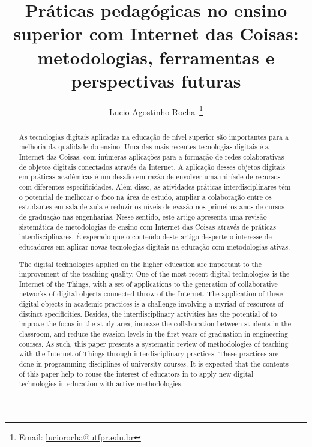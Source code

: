 \documentclass[portuguese]{textolivre}
\title{Práticas pedagógicas no ensino superior com Internet das Coisas: metodologias, ferramentas e perspectivas futuras}
\author[1]{Lucio Agostinho Rocha~\orcid{0000-0001-8804-8698}\thanks{Email: \href{mailto:luciorocha@utfpr.edu.br}{luciorocha@utfpr.edu.br}}}
\affil[1]{Universidade Tecnológica Federal do Paraná – campus Apucarana, Engenharia de Computação, Apucarana, PR, Brasil.}
\begin{document}
\maketitle

\begin{polyabstract}
\begin{abstract}
As tecnologias digitais aplicadas na educação de nível superior são importantes para a melhoria da qualidade do ensino. Uma das mais recentes tecnologias digitais é a Internet das Coisas, com inúmeras aplicações para a formação de redes colaborativas de objetos digitais conectados através da Internet. A aplicação desses objetos digitais em práticas acadêmicas é um desafio em razão de envolver uma miríade de recursos com diferentes especificidades. Além disso, as atividades práticas interdisciplinares têm o potencial de melhorar o foco na área de estudo, ampliar a colaboração entre os estudantes em sala de aula e reduzir os níveis de evasão nos primeiros anos de cursos de graduação nas engenharias. Nesse sentido, este artigo apresenta uma revisão sistemática de metodologias de ensino com Internet das Coisas através de práticas interdisciplinares. É esperado que o conteúdo deste artigo desperte o interesse de educadores em aplicar novas tecnologias digitais na educação com metodologias ativas.

\end{abstract}

\begin{english}
\begin{abstract}
The digital technologies applied on the higher education are important to the improvement of the teaching quality. One of the most recent digital technologies is the Internet of the Things, with a set of applications to the generation of collaborative networks of digital objects connected throw of the Internet. The application of these digital objects in academic practices is a challenge involving a myriad of resources of distinct specificities. Besides, the interdisciplinary activities has the potential of to improve the focus in the study area,  increase the collaboration between students in the classroom, and reduce the evasion levels in the first years of graduation in engineering courses. As such, this paper presents a systematic review of methodologies of teaching with the Internet of Things through interdisciplinary practices. These practices are done in programming disciplines of university courses. It is expected that the contents of this paper help to rouse the interest of educators in to apply new digital technologies in education with active methodologies.

\end{abstract}
\end{english}
\end{polyabstract}
\end{document}
